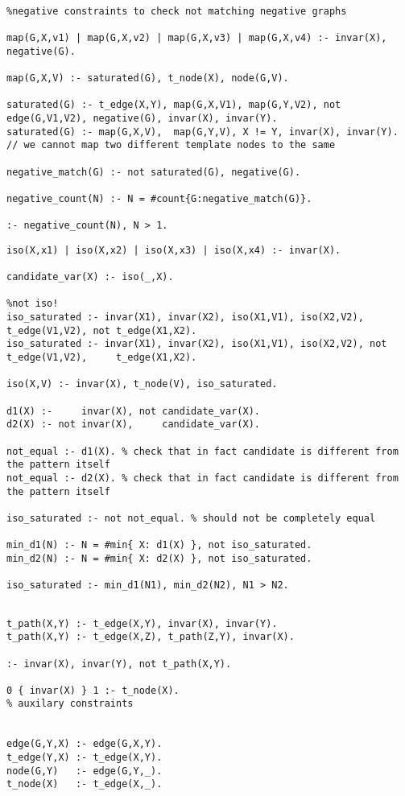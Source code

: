 \documentclass{article}
\theoremstyle{definition}
\begin{document}
\begin{lstlisting}[caption=ASP negative matching, style=model]
%Saturated Representation

%negative constraints to check not matching negative graphs

map(G,X,v1) | map(G,X,v2) | map(G,X,v3) | map(G,X,v4) :- invar(X), negative(G).

map(G,X,V) :- saturated(G), t_node(X), node(G,V).

saturated(G) :- t_edge(X,Y), map(G,X,V1), map(G,Y,V2), not edge(G,V1,V2), negative(G), invar(X), invar(Y).
saturated(G) :- map(G,X,V),  map(G,Y,V), X != Y, invar(X), invar(Y). // we cannot map two different template nodes to the same 

negative_match(G) :- not saturated(G), negative(G).

negative_count(N) :- N = #count{G:negative_match(G)}.

:- negative_count(N), N > 1.

\end{lstlisting}

\begin{lstlisting}[caption=Canonicity template-based check, style=model]
iso(X,x1) | iso(X,x2) | iso(X,x3) | iso(X,x4) :- invar(X).

candidate_var(X) :- iso(_,X).

%not iso!
iso_saturated :- invar(X1), invar(X2), iso(X1,V1), iso(X2,V2),     t_edge(V1,V2), not t_edge(X1,X2). 
iso_saturated :- invar(X1), invar(X2), iso(X1,V1), iso(X2,V2), not t_edge(V1,V2),     t_edge(X1,X2).

iso(X,V) :- invar(X), t_node(V), iso_saturated.

d1(X) :-     invar(X), not candidate_var(X). 
d2(X) :- not invar(X),     candidate_var(X).

not_equal :- d1(X). % check that in fact candidate is different from the pattern itself
not_equal :- d2(X). % check that in fact candidate is different from the pattern itself

iso_saturated :- not not_equal. % should not be completely equal

min_d1(N) :- N = #min{ X: d1(X) }, not iso_saturated.
min_d2(N) :- N = #min{ X: d2(X) }, not iso_saturated.

iso_saturated :- min_d1(N1), min_d2(N2), N1 > N2.
\end{lstlisting}

\begin{lstlisting}[caption=Auxilary predicates -- probably should be moved to appendix, style=model]
%selects subpattern

t_path(X,Y) :- t_edge(X,Y), invar(X), invar(Y).
t_path(X,Y) :- t_edge(X,Z), t_path(Z,Y), invar(X).

:- invar(X), invar(Y), not t_path(X,Y).

0 { invar(X) } 1 :- t_node(X).
% auxilary constraints


edge(G,Y,X) :- edge(G,X,Y).
t_edge(Y,X) :- t_edge(X,Y).
node(G,Y)   :- edge(G,Y,_).
t_node(X)   :- t_edge(X,_).
\end{lstlisting}
\end{document}
